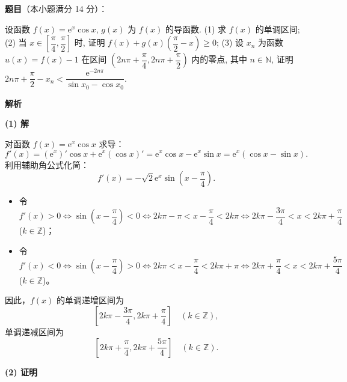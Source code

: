 \begin{answer}

\textbf{题目}（本小题满分 14 分）：

设函数 $f(x) = \mathrm{e}^x \cos x$, $g(x)$ 为 $f(x)$ 的导函数.
(1) 求 $f(x)$ 的单调区间;
(2) 当 $x \in \left[\dfrac{\pi}{4}, \dfrac{\pi}{2}\right]$ 时, 证明 $f(x) + g(x)\left(\dfrac{\pi}{2} - x\right) \geqslant 0$;
(3) 设 $x_n$ 为函数 $u(x) = f(x) - 1$ 在区间 $\left(2n\pi + \dfrac{\pi}{4}, 2n\pi + \dfrac{\pi}{2}\right)$ 内的零点, 其中 $n \in \mathbb{N}$, 证明 $2n\pi + \dfrac{\pi}{2} - x_n < \dfrac{\mathrm{e}^{-2n\pi}}{\sin x_0 - \cos x_0}$.

\textbf{解析}

\textbf{(1) 解}

对函数 $f(x) = \mathrm{e}^x \cos x$ 求导：
\nopagebreak[4]
\[f'(x) = (\mathrm{e}^x)' \cos x + \mathrm{e}^x (\cos x)' = \mathrm{e}^x \cos x - \mathrm{e}^x \sin x = \mathrm{e}^x (\cos x - \sin x).\]
利用辅助角公式化简：
\nopagebreak[4]
\[f'(x) = -\sqrt{2} \mathrm{e}^x \sin\left(x - \frac{\pi}{4}\right).\]
\begin{itemize}
\item 令 $f'(x) > 0 \iff \sin\left(x - \dfrac{\pi}{4}\right) < 0 \iff 2k\pi - \pi < x - \dfrac{\pi}{4} < 2k\pi \iff 2k\pi - \dfrac{3\pi}{4} < x < 2k\pi + \dfrac{\pi}{4}$ ($k \in \mathbb{Z}$)；
\item 令 $f'(x) < 0 \iff \sin\left(x - \dfrac{\pi}{4}\right) > 0 \iff 2k\pi < x - \dfrac{\pi}{4} < 2k\pi + \pi \iff 2k\pi + \dfrac{\pi}{4} < x < 2k\pi + \dfrac{5\pi}{4}$ ($k \in \mathbb{Z}$)。
\end{itemize}
因此，$f(x)$ 的单调递增区间为
\nopagebreak[4]
\[\left[2k\pi - \frac{3\pi}{4}, 2k\pi + \frac{\pi}{4}\right]\quad (k \in \mathbb{Z}),\]
单调递减区间为
\nopagebreak[4]
\[\left[2k\pi + \frac{\pi}{4}, 2k\pi + \frac{5\pi}{4}\right]\quad (k \in \mathbb{Z}).\]

\textbf{(2) 证明}


\end{answer}
